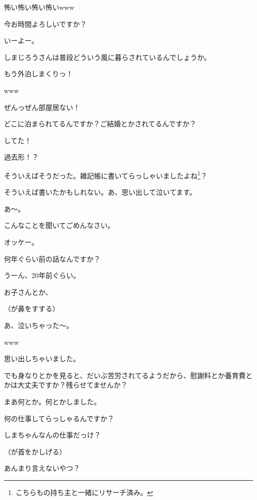 \documentclass[9pt,4aj]{jsarticle}
\begin{document}
\begin{multicols}{2}
怖い怖い怖い怖いwww

今お時間よろしいですか？

いーよー。

しまじろうさんは普段どういう風に暮らされているんでしょうか。

{\large もう外泊しまくりっ！}

www

ぜんっぜん部屋居ない！

どこに泊まられてるんですか？ご結婚とかされてるんですか？

{\large してた！}

過去形！？

そういえばそうだった。雑記帳に書いてらっしゃいましたよね\footnote{こちらもの持ち主と一緒にリサーチ済み。}？

そういえば書いたかもしれない。あ、思い出して泣いてます。

あ～。

こんなことを聞いてごめんなさい。

オッケー。

何年ぐらい前の話なんですか？

うーん、20年前ぐらい。

お子さんとか、

（が鼻をすする）

あ、泣いちゃった～。

www

思い出しちゃいました。

でも身なりとかを見ると、だいぶ苦労されてるようだから、慰謝料とか養育費とかは大丈夫ですか？残らせてませんか？

まあ何とか。何とかしました。

何の仕事してらっしゃるんですか？

しまちゃんなんの仕事だっけ？

（が首をかしげる）

あんまり言えないやつ？


\end{multicols}
\end{document}
